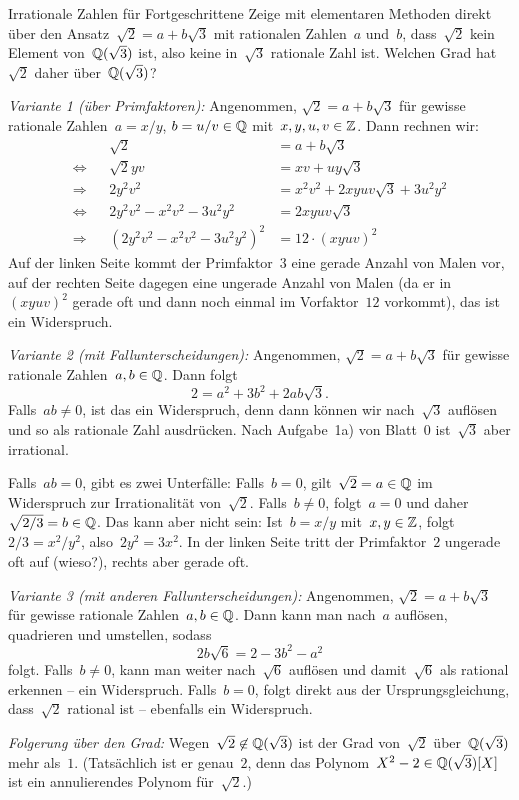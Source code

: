 \documentclass{algblatt}
\begin{document}
\begin{aufgabe}{Irrationale Zahlen für Fortgeschrittene}
Zeige mit elementaren Methoden direkt über den Ansatz~$\sqrt{2} = a +
b\sqrt{3}$ mit rationalen Zahlen~$a$ und~$b$, dass~$\sqrt{2}$ kein Element
von~$\mathbb{Q}(\sqrt{3})$ ist, also keine in~$\sqrt{3}$ rationale Zahl ist. Welchen
Grad hat~$\sqrt{2}$ daher über~$\mathbb{Q}(\sqrt{3})$?

\begin{loesung}
\emph{Variante 1 (über Primfaktoren):} Angenommen, $\sqrt{2} = a + b \sqrt{3}$
für gewisse rationale Zahlen~$a = x/y$, $b = u/v \in \mathbb{Q}$ mit~$x,y,u,v \in
\mathbb{Z}$. Dann rechnen wir:
\begin{align*}
  && \sqrt{2} &= a + b \sqrt{3} \\
  \Longleftrightarrow && \sqrt{2} y v &= xv + uy \sqrt{3} \\
  \Longrightarrow && 2 y^2 v^2 &= x^2 v^2 + 2 xyuv \sqrt{3} + 3 u^2 y^2 \\
  \Longleftrightarrow && 2 y^2 v^2 - x^2 v^2 - 3 u^2 y^2 &= 2 xyuv \sqrt{3} \\
  \Longrightarrow && (2 y^2 v^2 - x^2 v^2 - 3 u^2 y^2)^2 &= 12 \cdot (xyuv)^2
\end{align*}
Auf der linken Seite kommt der Primfaktor~$3$ eine gerade Anzahl von Malen vor,
auf der rechten Seite dagegen eine ungerade Anzahl von Malen (da er
in~$(xyuv)^2$ gerade oft und dann noch einmal im Vorfaktor~$12$ vorkommt), das
ist ein Widerspruch.

\emph{Variante 2 (mit Fallunterscheidungen):} Angenommen, $\sqrt{2} = a + b
\sqrt{3}$ für gewisse rationale Zahlen~$a, b \in \mathbb{Q}$. Dann folgt
\[ 2 = a^2 + 3b^2 + 2ab \sqrt{3}. \]
Falls~$ab \neq 0$, ist das ein Widerspruch, denn dann können wir
nach~$\sqrt{3}$ auflösen und so als rationale Zahl ausdrücken. Nach Aufgabe~1a)
von Blatt~0 ist~$\sqrt{3}$ aber irrational.

Falls~$ab = 0$, gibt es zwei Unterfälle: Falls~$b = 0$, gilt~$\sqrt{2} = a \in
\mathbb{Q}$ im Widerspruch zur Irrationalität von~$\sqrt{2}$. Falls~$b \neq 0$,
folgt~$a = 0$ und daher~$\sqrt{2/3} = b \in \mathbb{Q}$. Das kann aber nicht sein:
Ist~$b = x/y$ mit~$x,y \in \mathbb{Z}$, folgt~$2/3 = x^2/y^2$, also~$2y^2 = 3x^2$. In
der linken Seite tritt der Primfaktor~$2$ ungerade oft auf (wieso?), rechts
aber gerade oft.

\emph{Variante 3 (mit anderen Fallunterscheidungen):} Angenommen, $\sqrt{2} = a
+ b \sqrt{3}$ für gewisse rationale Zahlen~$a, b \in \mathbb{Q}$. Dann kann man
nach~$a$ auflösen, quadrieren und umstellen, sodass
\[ 2 b \sqrt{6} = 2 - 3 b^2 - a^2 \]
folgt. Falls~$b \neq 0$, kann man weiter nach~$\sqrt{6}$ auflösen und
damit~$\sqrt{6}$ als rational erkennen -- ein Widerspruch. Falls~$b = 0$, folgt
direkt aus der Ursprungsgleichung, dass~$\sqrt{2}$ rational ist -- ebenfalls
ein Widerspruch.

\emph{Folgerung über den Grad:} Wegen~$\sqrt{2} \not\in \mathbb{Q}(\sqrt{3})$ ist der
Grad von~$\sqrt{2}$ über~$\mathbb{Q}(\sqrt{3})$ mehr als~$1$. (Tatsächlich ist er
genau~$2$, denn das Polynom~$X^2 - 2 \in \mathbb{Q}(\sqrt{3})[X]$ ist ein
annulierendes Polynom für~$\sqrt{2}$.)
\end{loesung}
\end{aufgabe}
\end{document}
